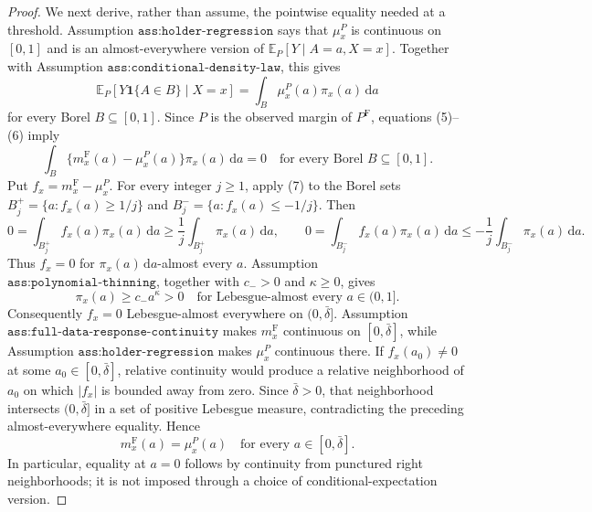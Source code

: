 \documentclass{article}
\begin{document}
\begin{proof}
We next derive, rather than assume, the pointwise equality needed at a threshold.  Assumption \(\texttt{ass:holder-regression}\) says that \(\mu_x^P\) is continuous on \([0,1]\) and is an almost-everywhere version of \(\mathbb E_P[Y\mid A=a,X=x]\).  Together with Assumption \(\texttt{ass:conditional-density-law}\), this gives
\[
 \mathbb E_P[Y\mathbf 1\{A\in B\}\mid X=x]
 =\int_B\mu_x^P(a)\pi_x(a)\,\mathrm da
 \tag{6}
\]
for every Borel \(B\subseteq[0,1]\).  Since \(P\) is the observed margin of \(P^{\mathrm F}\), equations (5)--(6) imply
\[
 \int_B\{m_x^{\mathrm F}(a)-\mu_x^P(a)\}\pi_x(a)\,\mathrm da=0
 \quad\text{for every Borel }B\subseteq[0,1].
 \tag{7}
\]
Put \(f_x=m_x^{\mathrm F}-\mu_x^P\).  For every integer \(j\geq1\), apply (7) to the Borel sets \(B_j^+=\{a:f_x(a)\geq1/j\}\) and \(B_j^-=\{a:f_x(a)\leq-1/j\}\).  Then
\[
 0=\int_{B_j^+}f_x(a)\pi_x(a)\,\mathrm da
 \geq \frac1j\int_{B_j^+}\pi_x(a)\,\mathrm da,
 \qquad
 0=\int_{B_j^-}f_x(a)\pi_x(a)\,\mathrm da
 \leq-\frac1j\int_{B_j^-}\pi_x(a)\,\mathrm da.
 \tag{8}
\]
Thus \(f_x=0\) for \(\pi_x(a)\,\mathrm da\)-almost every \(a\).  Assumption \(\texttt{ass:polynomial-thinning}\), together with \(c_->0\) and \(\kappa\geq0\), gives
\[
 \pi_x(a)\geq c_-a^\kappa>0
 \quad\text{for Lebesgue-almost every }a\in(0,1].
 \tag{9}
\]
Consequently \(f_x=0\) Lebesgue-almost everywhere on \((0,\bar\delta]\).  Assumption \(\texttt{ass:full-data-response-continuity}\) makes \(m_x^{\mathrm F}\) continuous on \([0,\bar\delta]\), while Assumption \(\texttt{ass:holder-regression}\) makes \(\mu_x^P\) continuous there.  If \(f_x(a_0)\neq0\) at some \(a_0\in[0,\bar\delta]\), relative continuity would produce a relative neighborhood of \(a_0\) on which \(|f_x|\) is bounded away from zero.  Since \(\bar\delta>0\), that neighborhood intersects \((0,\bar\delta]\) in a set of positive Lebesgue measure, contradicting the preceding almost-everywhere equality.  Hence
\[
 m_x^{\mathrm F}(a)=\mu_x^P(a)
 \quad\text{for every }a\in[0,\bar\delta].
 \tag{10}
\]
In particular, equality at \(a=0\) follows by continuity from punctured right neighborhoods; it is not imposed through a choice of conditional-expectation version.


\end{proof}
\end{document}
